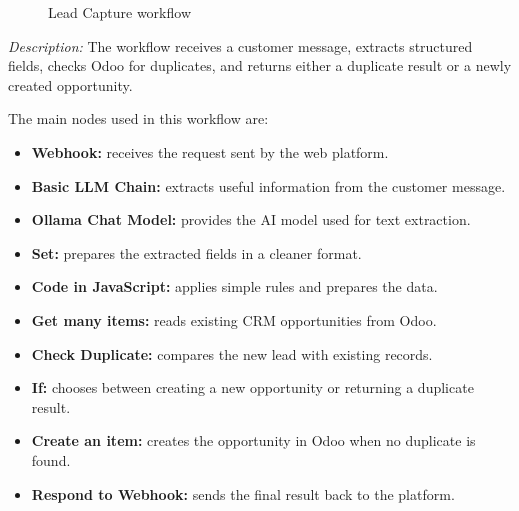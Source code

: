 \documentclass[12pt,a4paper,oneside]{report}
\newcommand{\figdesc}[1]{%
\vspace{-0.05cm}\noindent\small\textit{Description:} #1\par\normalsize\vspace{0.30cm}%
}
\begin{document}
\begin{figure}[H]
\centering
{}
\caption{Lead Capture workflow}
\label{fig:lead-capture-workflow}
\end{figure}
\figdesc{The workflow receives a customer message, extracts structured fields, checks Odoo for duplicates, and returns either a duplicate result or a newly created opportunity.}


The main nodes used in this workflow are:

\begin{itemize}
\item \textbf{Webhook:} receives the request sent by the web platform.
\item \textbf{Basic LLM Chain:} extracts useful information from the customer message.
\item \textbf{Ollama Chat Model:} provides the AI model used for text extraction.
\item \textbf{Set:} prepares the extracted fields in a cleaner format.
\item \textbf{Code in JavaScript:} applies simple rules and prepares the data.
\item \textbf{Get many items:} reads existing CRM opportunities from Odoo.
\item \textbf{Check Duplicate:} compares the new lead with existing records.
\item \textbf{If:} chooses between creating a new opportunity or returning a duplicate result.
\item \textbf{Create an item:} creates the opportunity in Odoo when no duplicate is found.
\item \textbf{Respond to Webhook:} sends the final result back to the platform.
\end{itemize}
\end{document}

